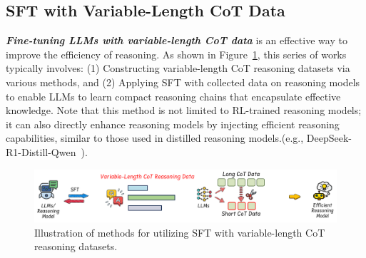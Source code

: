 \subsection{SFT with Variable-Length CoT Data}
\label{sec:longshortdata}


\textbf{\textit{Fine-tuning LLMs with variable-length CoT data}} is an effective way to improve the efficiency of reasoning. As shown in Figure~\ref{fig:sft}, this series of works typically involves: (1) Constructing variable-length CoT reasoning datasets via various methods, and (2) Applying SFT with collected data on reasoning models to enable LLMs to learn compact reasoning chains that encapsulate effective knowledge. Note that this method is not limited to RL-trained reasoning models; it can also directly enhance reasoning models by injecting efficient reasoning capabilities, similar to those used in distilled reasoning models.(e.g., DeepSeek-R1-Distill-Qwen~\cite{guo2025deepseek}).


\begin{figure}[h]
    \centering
    \includegraphics[width=\linewidth]{figs/sft.pdf}
    \caption{Illustration of methods for utilizing SFT with variable-length CoT reasoning datasets.}
    \label{fig:sft}
\end{figure}

